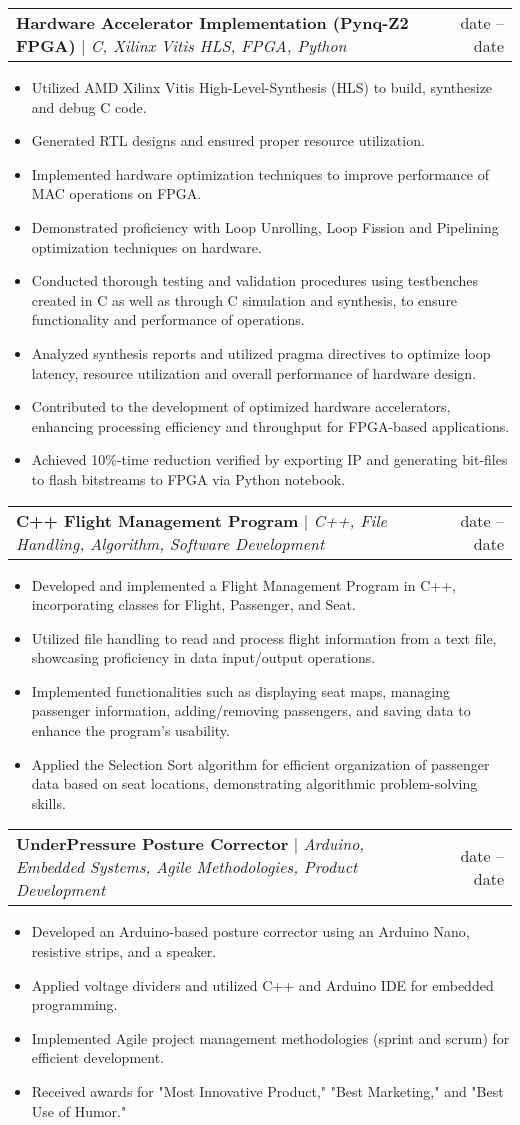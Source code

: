 \documentclass[A4,10pt]{article}
\makeatletter
\newcommand{\resumeItem}[1]{
  \item\small{
    {#1 \vspace{-2pt}}
  }
}
\newcommand{\resumeProjectHeading}[2]{
    \item
    \begin{tabular*}{0.97\textwidth}{l@{\extracolsep{\fill}}r}
      \small#1 & #2 \\
    \end{tabular*}\vspace{-7pt}
}
\newcommand{\resumeItemListStart}{\begin{itemize}}
\newcommand{\resumeItemListEnd}{\end{itemize}\vspace{-5pt}}
\makeatother
\begin{document}
        \resumeProjectHeading
        {\textbf{Hardware Accelerator Implementation (Pynq-Z2 FPGA)} $|$ \emph{C, Xilinx Vitis HLS, FPGA, Python}}{date -- date}
        \resumeItemListStart
          \resumeItem{Utilized AMD Xilinx Vitis High-Level-Synthesis (HLS) to build, synthesize and debug C code.}
          \resumeItem{Generated RTL designs and ensured proper resource utilization.}
          \resumeItem{Implemented hardware optimization techniques to improve performance of MAC operations on FPGA.}
          \resumeItem{Demonstrated proficiency with Loop Unrolling, Loop Fission and Pipelining optimization techniques on hardware.}
          \resumeItem{Conducted thorough testing and validation procedures using testbenches created in C as well as through C simulation and synthesis, to ensure functionality and performance of operations.}
          \resumeItem{Analyzed synthesis reports and utilized pragma directives to optimize loop latency, resource utilization and overall performance of hardware design.}
          \resumeItem{Contributed to the development of optimized hardware accelerators, enhancing processing efficiency and throughput for FPGA-based applications.}
          \resumeItem{Achieved 10\%-time reduction verified by exporting IP and generating bit-files to flash bitstreams to FPGA via Python notebook.}
        \resumeItemListEnd

        \resumeProjectHeading
        {\textbf{C++ Flight Management Program} $|$ \emph{C++, File Handling, Algorithm, Software Development}}{date -- date}
        \resumeItemListStart
          \resumeItem{Developed and implemented a Flight Management Program in C++, incorporating classes for Flight, Passenger, and Seat.}
          \resumeItem{Utilized file handling to read and process flight information from a text file, showcasing proficiency in data input/output operations.}
          \resumeItem{Implemented functionalities such as displaying seat maps, managing passenger information, adding/removing passengers, and saving data to enhance the program's usability.}
          \resumeItem{Applied the Selection Sort algorithm for efficient organization of passenger data based on seat locations, demonstrating algorithmic problem-solving skills.}
        \resumeItemListEnd
  
        \resumeProjectHeading
        {\textbf{UnderPressure Posture Corrector} $|$ \emph{Arduino, Embedded Systems, Agile Methodologies, Product Development}}{date -- date}
        \resumeItemListStart
          \resumeItem{Developed an Arduino-based posture corrector using an Arduino Nano, resistive strips, and a speaker.}
          \resumeItem{Applied voltage dividers and utilized C++ and Arduino IDE for embedded programming.}
          \resumeItem{Implemented Agile project management methodologies (sprint and scrum) for efficient development.}
          \resumeItem{Received awards for "Most Innovative Product," "Best Marketing," and "Best Use of Humor."}
        \resumeItemListEnd
  
\end{document}
